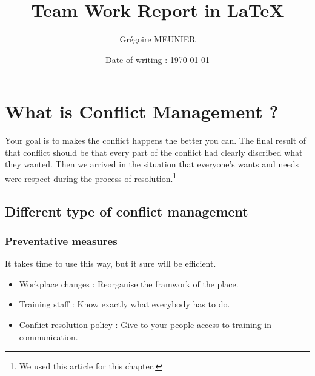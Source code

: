 \documentclass[a4paper,12pt]{report} %
\title{Team Work Report in \LaTeX}
\author{Grégoire MEUNIER}
\date{Date of writing : \today}
\begin{document}
\maketitle
\tableofcontents

\chapter{What is Conflict Management ?} \newpage
Your goal is to makes the conflict happens the better you can. The final result of that conflict should be that every part of the conflict had clearly discribed what they wanted. Then we arrived in the situation that everyone’s wants and needs were respect during the process of resolution.\footnote{We used this article \cite{Cmana:1} for this chapter.}
\section{Different type of conflict management}
\subsection{Preventative measures}
It takes time to use this way, but it sure will be efficient.
\begin{itemize}
\item Workplace changes : Reorganise the framwork of the place.
\item Training staff : Know exactly what everybody has to do.
\item Conflict resolution policy : Give to your people access to training in communication.
\end{itemize}
\end{document}
